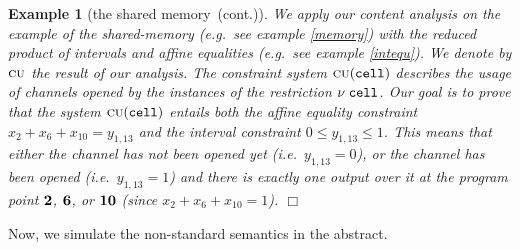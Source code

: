 \documentclass{article}
\newcommand{\boxexample}{$\Box$}
\newtheorem{example}[thm]{Example}
\newcommand{\nuu}{\nu\;}
\newcommand{\pp}[1]{$\bf{#1}$}
\newcommand{\internal}[1]{\textnormal{\texttt{#1}}}
\newcommand{\ccell}{\internal{cell}}
\newcommand{\memlaba}{1}
\newcommand{\memlabb}{2}
\newcommand{\memlabf}{6}
\newcommand{\memlabj}{10}
\newcommand{\memlabm}{13}
\newcommand{\continued}{(cont.)}
\newcommand{\shareanalysis}{the shared memory}
\newcommand{\tp}{\textsc{cu}}
\newcommand{\icontentanalysis}{\shareanalysis\ \continued}
\begin{document}
\begin{example}[\icontentanalysis]
We apply our content analysis on the example of the shared-memory (e.g.~see example \ref{memory}) with the reduced product of intervals and affine equalities (e.g.~see example \ref{intequ}).
We denote by $\tp$ the result of our analysis. 
The constraint system  $\tp(\ccell)$ describes the usage of channels opened by the instances of the restriction $\nuu \ccell$.
Our goal is to prove that the system $\tp(\ccell)$ entails both the affine equality constraint $x_{\memlabb} + x_{\memlabf} + x_{\memlabj} = y_{\memlaba,\memlabm}$ and the interval constraint $0\leq y_{\memlaba,\memlabm} \leq 1$.
This means that either the channel has not been opened yet (i.e.~$y_{\memlaba,\memlabm}=0$), or the channel has been opened (i.e.~$y_{\memlaba,\memlabm}=1$) and there is exactly one output over it at the program point \pp{\memlabb}, \pp{\memlabf}, or \pp{\memlabj} (since $x_{\memlabb} + x_{\memlabf} + x_{\memlabj}=1$).
\boxexample\end{example}

Now, we simulate the non-standard semantics in the abstract.
\end{document}
